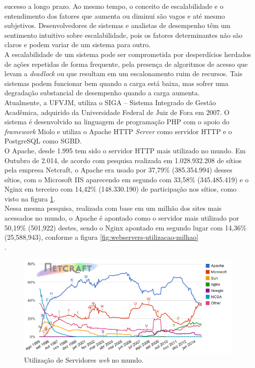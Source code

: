 sucesso a longo prazo. Ao mesmo tempo, o conceito de escalabilidade e o 
entendimento dos fatores que aumenta ou diminui são vagos e até mesmo 
subjetivos. Desenvolvedores de sistemas e analistas de desempenho têm um 
sentimento intuitivo sobre escalabilidade, pois os fatores determinantes não 
são claros e podem variar de um sistema para outro.\\
A escalabilidade de um sistema pode ser comprometida por desperdícios herdados 
de ações repetidas de forma frequente, pela presença de algoritmos de acesso 
que levam a \textit{deadlock} ou que resultam em um escalonamento ruim de 
recursos. Tais sistemas podem funcionar bem quando a carga está baixa, mas 
sofrer uma degradação substancial de desempenho quando a carga aumenta.\\
Atualmente, a UFVJM, utiliza o SIGA – Sistema Integrado de Gestão Acadêmica, 
adquirido da Universidade Federal de Juiz de Fora em 2007. O sistema é 
desenvolvido na linguagem de programação PHP com o apoio do \textit{framework} 
Miolo e utiliza o Apache HTTP \textit{Server} como servidor HTTP e o PostgreSQL 
como SGBD.\\
O Apache, desde 1.995 tem sido o servidor HTTP mais utilizado no mundo. Em 
Outubro de 2.014, de acordo com pesquisa realizada em 1.028.932.208 de sítios 
pela empresa Netcraft, o Apache era usado por 37,79\% (385.354.994) desses 
sítios, com o Microsoft IIS aparecendo em segundo com 33,58\% (345.485.419) e o 
Nginx em terceiro com 14,42\% (148.330.190) de participação nos sítios, como 
visto na figura \ref{fig:webservers-utilizacao}.\\
Nessa mesma pesquisa, realizada com base em um milhão dos sites mais acessados 
no mundo, o Apache é apontado como o servidor mais utilizado por 50,19\% 
(501,922) destes, sendo o Nginx apontado em segundo lugar com 14,36\% 
(25,588,943), conforme a figura \ref{fig:webservers-utilizacao-milhao}\\.
\begin{figure}[htb]
	\centering
	\includegraphics[width=1\linewidth]{figuras/grafico1}
	\caption{Utilização de Servidores \textit{web} no mundo.}
	\label{fig:webservers-utilizacao}
\end{figure}

